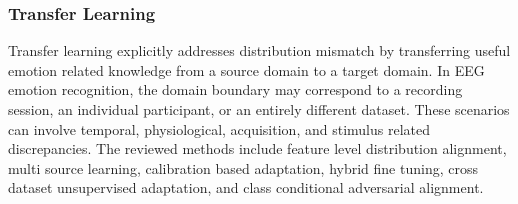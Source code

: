 \documentclass[ASNA,twocolumn]{USG}
\begin{document}
\subsubsection{Transfer Learning}
\label{subsubsec:transfer_learning_evaluation}

Transfer learning explicitly addresses distribution mismatch by transferring useful emotion related knowledge from a source domain to a target domain. In EEG emotion recognition, the domain boundary may correspond to a recording session, an individual participant, or an entirely different dataset. These scenarios can involve temporal, physiological, acquisition, and stimulus related discrepancies. The reviewed methods include feature level distribution alignment, multi source learning, calibration based adaptation, hybrid fine tuning, cross dataset unsupervised adaptation, and class conditional adversarial alignment.
\end{document}
